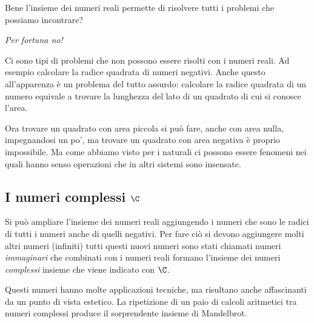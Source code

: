 Bene l'insieme dei numeri reali permette di risolvere tutti i problemi che 
possiamo incontrare? 

\begin{center} \emph{Per fortuna no!} \end{center} 

Ci sono tipi di problemi che non possono essere risolti con i numeri reali.
Ad esempio calcolare la radice quadrata di numeri negativi. 
Anche questo all'apparenza è un problema del tutto assurdo: calcolare la 
radice quadrata di un numero equivale a trovare la lunghezza del lato di un 
quadrato di cui si conosce l'area. 

Ora trovare un quadrato con area piccola si può fare, anche con 
area nulla, impegnandosi un po', ma trovare un quadrato con area negativa 
è proprio impossibile. 
Ma come abbiamo visto per i naturali ci possono essere fenomeni nei quali 
hanno senso operazioni che in altri sistemi sono insensate.

\subsection{I numeri complessi $\C$}
\label{subsec:insnum_complessi}

Si può ampliare l'insieme dei numeri reali aggiungendo i numeri che sono le 
radici di tutti i numeri anche di quelli negativi. Per fare ciò si devono 
aggiungere molti altri numeri (infiniti) tutti questi nuovi numeri sono stati 
chiamati numeri \emph{immaginari} che combinati con i numeri reali formano 
l'insieme dei numeri \emph{complessi} insieme che viene indicato con $\C$.

Questi numeri hanno molte applicazioni tecniche, ma risultano anche 
affascinanti da un punto di vista estetico. La ripetizione di un paio di 
calcoli aritmetici tra numeri complessi produce il sorprendente insieme di 
Mandelbrot.

